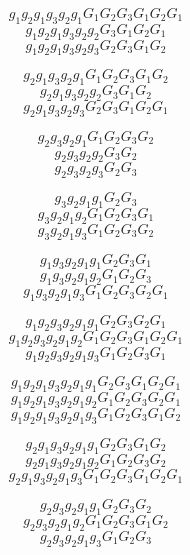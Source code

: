 $$g_{1}g_{2}g_{1}g_{3}g_{2}    g_{1}   G_{1}G_{2}G_{3}G_{1}G_{2}G_{1}$$
$$g_{1}g_{2}g_{1}g_{3}g_{2}    g_{2}   G_{3}G_{1}G_{2}G_{1}$$
$$g_{1}g_{2}g_{1}g_{3}g_{2}    g_{3}   G_{2}G_{3}G_{1}G_{2}$$


$$g_{2}g_{1}g_{3}g_{2}    g_{1}   G_{1}G_{2}G_{3}G_{1}G_{2}$$
$$g_{2}g_{1}g_{3}g_{2}    g_{2}   G_{3}G_{1}G_{2}$$
$$g_{2}g_{1}g_{3}g_{2}    g_{3}   G_{2}G_{3}G_{1}G_{2}G_{1}$$


$$g_{2}g_{3}g_{2}    g_{1}   G_{1}G_{2}G_{3}G_{2}$$
$$g_{2}g_{3}g_{2}    g_{2}   G_{3}G_{2}$$
$$g_{2}g_{3}g_{2}    g_{3}   G_{2}G_{3}$$


$$g_{3}g_{2}g_{1}    g_{1}   G_{2}G_{3}$$
$$g_{3}g_{2}g_{1}    g_{2}   G_{1}G_{2}G_{3}G_{1}$$
$$g_{3}g_{2}g_{1}    g_{3}   G_{1}G_{2}G_{3}G_{2}$$


$$g_{1}g_{3}g_{2}g_{1}    g_{1}   G_{2}G_{3}G_{1}$$
$$g_{1}g_{3}g_{2}g_{1}    g_{2}   G_{1}G_{2}G_{3}$$
$$g_{1}g_{3}g_{2}g_{1}    g_{3}   G_{1}G_{2}G_{3}G_{2}G_{1}$$


$$g_{1}g_{2}g_{3}g_{2}g_{1}    g_{1}   G_{2}G_{3}G_{2}G_{1}$$
$$g_{1}g_{2}g_{3}g_{2}g_{1}    g_{2}   G_{1}G_{2}G_{3}G_{1}G_{2}G_{1}$$
$$g_{1}g_{2}g_{3}g_{2}g_{1}    g_{3}   G_{1}G_{2}G_{3}G_{1}$$


$$g_{1}g_{2}g_{1}g_{3}g_{2}g_{1}    g_{1}   G_{2}G_{3}G_{1}G_{2}G_{1}$$
$$g_{1}g_{2}g_{1}g_{3}g_{2}g_{1}    g_{2}   G_{1}G_{2}G_{3}G_{2}G_{1}$$
$$g_{1}g_{2}g_{1}g_{3}g_{2}g_{1}    g_{3}   G_{1}G_{2}G_{3}G_{1}G_{2}$$


$$g_{2}g_{1}g_{3}g_{2}g_{1}    g_{1}   G_{2}G_{3}G_{1}G_{2}$$
$$g_{2}g_{1}g_{3}g_{2}g_{1}    g_{2}   G_{1}G_{2}G_{3}G_{2}$$
$$g_{2}g_{1}g_{3}g_{2}g_{1}    g_{3}   G_{1}G_{2}G_{3}G_{1}G_{2}G_{1}$$


$$g_{2}g_{3}g_{2}g_{1}    g_{1}   G_{2}G_{3}G_{2}$$
$$g_{2}g_{3}g_{2}g_{1}    g_{2}   G_{1}G_{2}G_{3}G_{1}G_{2}$$
$$g_{2}g_{3}g_{2}g_{1}    g_{3}   G_{1}G_{2}G_{3}$$



